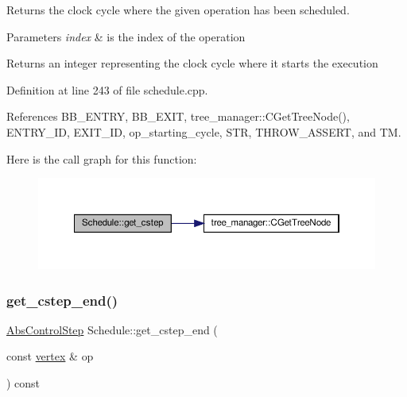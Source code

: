 Returns the clock cycle where the given operation has been scheduled. 


\begin{DoxyParams}{Parameters}
{\em index} & is the index of the operation \\
\hline
\end{DoxyParams}
\begin{DoxyReturn}{Returns}
an integer representing the clock cycle where it starts the execution 
\end{DoxyReturn}


Definition at line 243 of file schedule.\+cpp.



References B\+B\+\_\+\+E\+N\+T\+RY, B\+B\+\_\+\+E\+X\+IT, tree\+\_\+manager\+::\+C\+Get\+Tree\+Node(), E\+N\+T\+R\+Y\+\_\+\+ID, E\+X\+I\+T\+\_\+\+ID, op\+\_\+starting\+\_\+cycle, S\+TR, T\+H\+R\+O\+W\+\_\+\+A\+S\+S\+E\+RT, and TM.

Here is the call graph for this function\+:
\nopagebreak
\begin{figure}[H]
\begin{center}
\leavevmode
\includegraphics[width=350pt]{df/d61/classSchedule_a9899b55e9cb1322b52e3c93bc4d27a70_cgraph}
\end{center}
\end{figure}
\mbox{\label{classSchedule_ae37f5691291fd1656e4704c59ded9249}} 
\subsubsection{\texorpdfstring{get\+\_\+cstep\+\_\+end()}{get\_cstep\_end()}\hspace{0.1cm}{\footnotesize\ttfamily [1/2]}}
{\footnotesize\ttfamily \hyperlink{structAbsControlStep}{Abs\+Control\+Step} Schedule\+::get\+\_\+cstep\+\_\+end (\begin{DoxyParamCaption}\item[{const \hyperlink{graph_8hpp_abefdcf0544e601805af44eca032cca14}{vertex} \&}]{op }\end{DoxyParamCaption}) const}



